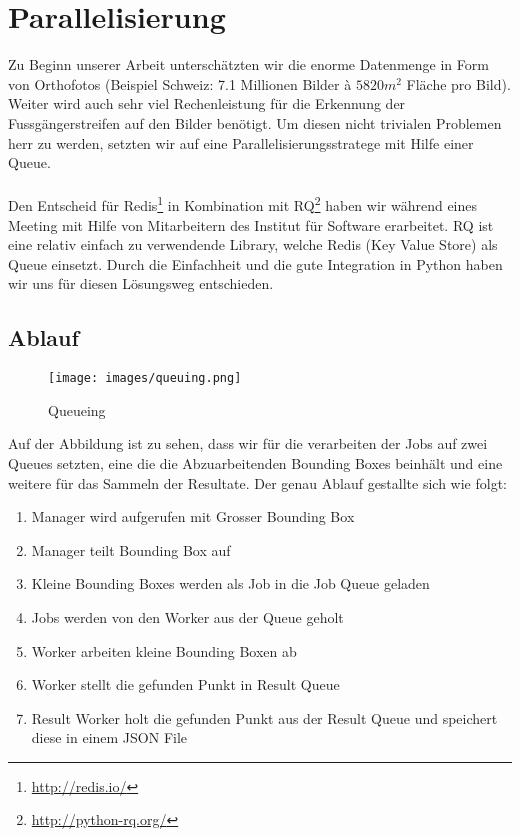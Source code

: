 \section{Parallelisierung}
Zu Beginn unserer Arbeit unterschätzten wir die enorme Datenmenge in Form von Orthofotos (Beispiel Schweiz: 7.1 Millionen Bilder à $5820 m^{2}$ Fläche pro Bild). Weiter wird auch sehr viel Rechenleistung für die Erkennung der Fussgängerstreifen auf den Bilder benötigt. Um diesen nicht trivialen Problemen herr zu werden, setzten wir auf eine Parallelisierungsstratege mit Hilfe einer Queue. \\ \\

Den Entscheid für Redis\footnote{\url{http://redis.io/}} in Kombination mit RQ\footnote{\url{http://python-rq.org/}} haben wir während eines Meeting mit Hilfe von Mitarbeitern des Institut für Software erarbeitet. RQ ist eine relativ einfach zu verwendende Library, welche Redis (Key Value Store) als Queue einsetzt. Durch die Einfachheit und die gute Integration in Python haben wir uns für diesen Lösungsweg entschieden.

\newpage
\subsection{Ablauf}
\begin{figure}[H]
\texttt{[image: images/queuing.png]}
\caption[Queueing]{Queueing}
\end{figure}
Auf der Abbildung ist zu sehen, dass wir für die verarbeiten der Jobs auf zwei Queues setzten, eine die die Abzuarbeitenden Bounding Boxes beinhält und eine weitere für das Sammeln der Resultate. Der genau Ablauf gestallte sich wie folgt:
\begin{enumerate}
		\item Manager wird aufgerufen mit Grosser Bounding Box
		\item Manager teilt Bounding Box auf
		\item Kleine Bounding Boxes werden als Job in die Job Queue geladen
		\item Jobs werden von den Worker aus der Queue geholt
		\item Worker arbeiten kleine Bounding Boxen ab
		\item Worker stellt die gefunden Punkt in Result Queue
		\item Result Worker holt die gefunden Punkt aus der Result Queue und speichert diese in einem JSON File 
\end{enumerate}









